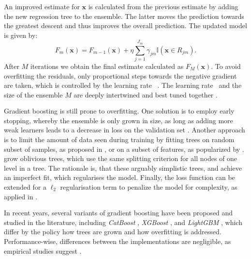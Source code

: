 An improved estimate for $\mathbf{x}$ is calculated from the previous estimate by adding the new regression tree to the ensemble. The latter moves the prediction towards the greatest descent and thus improves the overall prediction. The updated model is given by:
\begin{equation}
    F_{m}(\mathbf{x})=F_{m-1}(\mathbf{x})+\eta \sum_{j=1}^{J_{m}} \gamma_{j m} \mathbb{I}\left(\mathbf{x} \in R_{j m}\right).
\end{equation}
After $M$ iterations we obtain the final estimate calculated as $F_{M}\left(\mathbf{x}\right)$. To avoid \gls{overfitting} the residuals, only proportional steps towards the negative gradient are taken, which is controlled by the learning rate \eta~\autocite[][13]{friedmanGreedyFunctionApproximation2001}. The learning rate \eta~and the size of the ensemble $M$ are deeply intertwined and best tuned together \autocite[][13]{friedmanGreedyFunctionApproximation2001}.

Gradient boosting is still prone to \gls{overfitting}. One solution is to employ early stopping, whereby the ensemble is only grown in size, as long as adding more weak learners leads to a decrease in loss on the validation set \autocite[][384]{hastietrevorElementsStatisticalLearning2009}. Another approach is to limit the amount of data seen during training by fitting trees on random subset of samples, as proposed in \textcite[][3]{friedmanStochasticGradientBoosting2002}, or on a subset of features, as popularized by \textcite[][3]{chenXGBoostScalableTree2016}. \textcite[][6]{prokhorenkovaCatBoostUnbiasedBoosting2018} grow oblivious trees, which use the same splitting criterion for all nodes of one level in a tree. The rationale is, that these arguably simplistic trees, and achieve an imperfect fit, which regularises the model. Finally, the loss function can be extended for a $\ell_2$ regularisation term to penalize the model for complexity, as applied in \textcite[][2]{chenXGBoostScalableTree2016}.

In recent years, several variants of gradient boosting have been proposed and studied in the literature, including \emph{CatBoost} \autocite[][1--23]{prokhorenkovaCatBoostUnbiasedBoosting2018}, \emph{XGBoost} \autocite[][1--13]{chenXGBoostScalableTree2016}, and \emph{LightGBM} \autocite[][3]{keLightGBMHighlyEfficient2017}, which differ by the policy how trees are grown and how \gls{overfitting} is addressed. Performance-wise, differences between the implementations are negligible, as empirical studies suggest \autocites[][8]{grinsztajnWhyTreebasedModels2022}[][19--20]{gorishniyRevisitingDeepLearning2021}[][7]{somepalliSaintImprovedNeural2021}[][14]{borisovDeepNeuralNetworks2022}.

